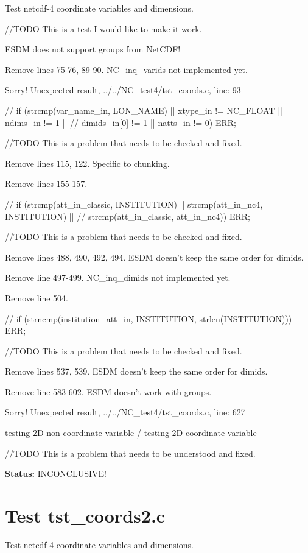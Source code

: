 Test netcdf-4 coordinate variables and dimensions.

//TODO This is a test I would like to make it work.

ESDM does not support groups from NetCDF!

Remove lines 75-76, 89-90. NC\_inq\_varids not implemented yet.

Sorry! Unexpected result, ../../NC\_test4/tst\_coords.c, line: 93

// if (strcmp(var\_name\_in, LON\_NAME) || xtype\_in != NC\_FLOAT || ndims\_in != 1 ||
// dimids\_in[0] != 1 || natts\_in != 0) ERR;

//TODO This is a problem that needs to be checked and fixed.

Remove lines 115, 122. Specific to chunking.

Remove lines 155-157.

// if (strcmp(att\_in\_classic, INSTITUTION) || strcmp(att\_in\_nc4, INSTITUTION) ||
// strcmp(att\_in\_classic, att\_in\_nc4)) ERR;

//TODO This is a problem that needs to be checked and fixed.

Remove lines 488, 490, 492, 494. ESDM doesn't keep the same order for dimids.

Remove line 497-499. NC\_inq\_dimids not implemented yet.

Remove line 504.

// if (strncmp(institution\_att\_in, INSTITUTION, strlen(INSTITUTION))) ERR;

//TODO This is a problem that needs to be checked and fixed.

Remove lines 537, 539. ESDM doesn't keep the same order for dimids.

Remove line 583-602. ESDM doesn't work with groups.

Sorry! Unexpected result, ../../NC\_test4/tst\_coords.c, line: 627

testing 2D non-coordinate variable / testing 2D coordinate variable

//TODO This is a problem that needs to be understood and fixed.

{\bf \large Status: } INCONCLUSIVE!

\section{Test tst\_coords2.c}

Test netcdf-4 coordinate variables and dimensions.

